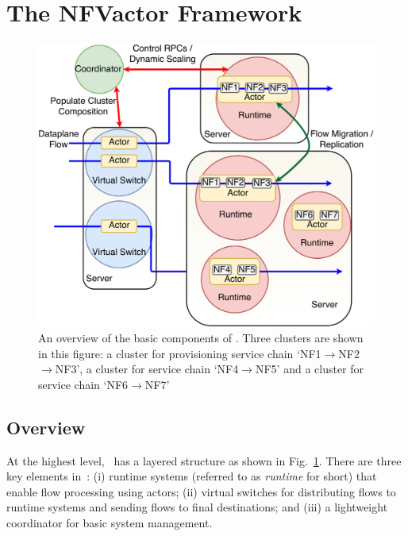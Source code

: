 
\section {The NFVactor Framework}

\begin{figure}[!t]
  \centering
  \includegraphics[width=\columnwidth]{chap-nfvactor/figure/new-nfactor-cluster.pdf}
  \caption{An overview of the basic components of \nfactor. Three clusters are shown in this figure: a cluster for provisioning service chain `NF1$\rightarrow$NF2$\rightarrow$NF3', a cluster for service chain `NF4$\rightarrow$NF5' and a cluster for service chain `NF6$\rightarrow$NF7'}
  \label{fig:runtime}
\end{figure}

\subsection{Overview}
\label{sec:overview}

At the highest level, \nfactor~has a layered structure as shown in Fig.~\ref{fig:runtime}. There are three key elements in~\nfactor: (i) runtime systems (referred to as \textit{runtime} for short) that enable flow processing using actors; (ii) virtual switches for distributing flows to runtime systems and sending flows to final destinations; and (iii) a lightweight coordinator for basic system management.

